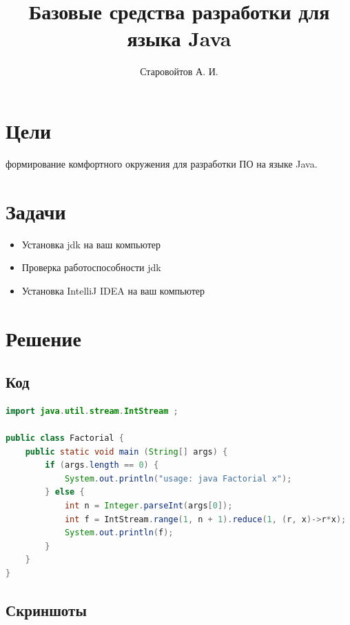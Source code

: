 \documentclass{iu9lab}
\begin{document}
\title{Базовые средства разработки для языка Java}
\author{Старовойтов А. И.}
\maketitle

\section{Цели}

формирование комфортного окружения для разработки ПО на языке Java.

\section{Задачи}

\begin{itemize}
  \item
        Установка jdk на ваш компьютер
  \item
        Проверка работоспособности jdk
  \item
        Установка IntelliJ IDEA на ваш компьютер
\end{itemize}

\section{Решение}

\subsection{Код}

\begin{lstlisting}[language=java]
import java.util.stream.IntStream ;

public class Factorial {
    public static void main (String[] args) {
        if (args.length == 0) {
            System.out.println("usage: java Factorial x");
        } else {
            int n = Integer.parseInt(args[0]);
            int f = IntStream.range(1, n + 1).reduce(1, (r, x)->r*x);
            System.out.println(f);
        }
    }
}
\end{lstlisting}

\subsection{Скриншоты}
\end{document}
